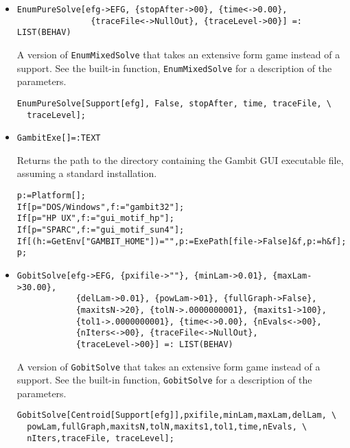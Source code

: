 \begin{itemize}
\item{}
\protect \large \begin{verbatim}
EnumPureSolve[efg->EFG, {stopAfter->00}, {time<->0.00}, 
               {traceFile<->NullOut}, {traceLevel->00}] =: LIST(BEHAV)
\end{verbatim}\normalsize

\bd 
A version of \verb+EnumMixedSolve+ that takes an extensive form
game instead of a support.  See the built-in function,
\verb+EnumMixedSolve+ for a description of the parameters.
\begin{verbatim}
EnumPureSolve[Support[efg], False, stopAfter, time, traceFile, \
  traceLevel];
\end{verbatim} 
\ed

\item{}
\protect \large \begin{verbatim}
GambitExe[]=:TEXT
\end{verbatim}\normalsize

\bd 
Returns the path to the directory containing the Gambit GUI executable
file, assuming a standard installation.  
\begin{verbatim}
p:=Platform[];
If[p="DOS/Windows",f:="gambit32"];
If[p="HP UX",f:="gui_motif_hp"];
If[p="SPARC",f:="gui_motif_sun4"];
If[(h:=GetEnv["GAMBIT_HOME"])="",p:=ExePath[file->False]&f,p:=h&f];
p;
\end{verbatim} 
\ed

\item{}
\protect \large \begin{verbatim}
GobitSolve[efg->EFG, {pxifile->""}, {minLam->0.01}, {maxLam->30.00}, 
            {delLam->0.01}, {powLam->01}, {fullGraph->False}, 
            {maxitsN->20}, {tolN->.0000000001}, {maxits1->100}, 
            {tol1->.0000000001}, {time<->0.00}, {nEvals<->00}, 
            {nIters<->00}, {traceFile<->NullOut}, 
            {traceLevel->00}] =: LIST(BEHAV)
\end{verbatim}\normalsize

\bd 
A version of \verb+GobitSolve+ that takes an extensive form
game instead of a support.  See the built-in function,
\verb+GobitSolve+ for a description of the parameters.
\begin{verbatim}
GobitSolve[Centroid[Support[efg]],pxifile,minLam,maxLam,delLam, \
  powLam,fullGraph,maxitsN,tolN,maxits1,tol1,time,nEvals, \
  nIters,traceFile, traceLevel];
\end{verbatim} 
\ed


\end{itemize}

